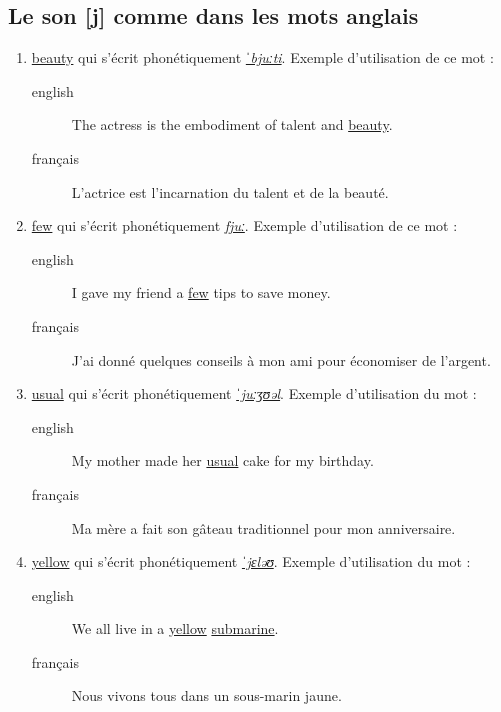 \subsection{Le son [j] comme dans les mots anglais}
\label{sec:orgacfdead}
\begin{enumerate}
\item \href{http://www.wordreference.com/enfr/beauty}{beauty} qui s'écrit phonétiquement \href{https://en.oxforddictionaries.com/definition/beauty}{\emph{ˈbjuːti}}. Exemple d'utilisation
de ce mot :
\begin{description}
\item[{english}] \textenglish{The actress is the embodiment of talent and \href{https://youtu.be/IzwWXNxFiyA}{beauty}.}
\item[{français}] L'actrice est l'incarnation du talent et de la
beauté.
\end{description}
\item \href{http://www.wordreference.com/enfr/few}{few} qui s'écrit phonétiquement \href{https://en.oxforddictionaries.com/definition/few}{\emph{fjuː}}. Exemple d'utilisation de ce
mot : 
\begin{description}
\item[{english}] \textenglish{I gave my friend a \href{https://youtu.be/6E2hYDIFDIU}{few} tips to save money.}
\item[{français}] J'ai donné quelques conseils à mon ami pour
économiser de l'argent.
\end{description}
\item \href{http://www.wordreference.com/enfr/usual}{usual} qui s'écrit phonétiquement \href{https://en.oxforddictionaries.com/definition/usual}{\emph{ˈjuːʒʊəl}}. Exemple d'utilisation
du mot :
\begin{description}
\item[{english}] \textenglish{My mother made her \href{https://youtu.be/ThLRPCs8uzc}{usual} cake for my birthday.}
\item[{français}] Ma mère a fait son gâteau traditionnel pour mon
anniversaire.
\end{description}
\item \href{http://www.wordreference.com/enfr/yellow}{yellow} qui s'écrit phonétiquement \href{https://en.oxforddictionaries.com/definition/yellow}{\emph{ˈjɛləʊ}}. Exemple d'utilisation
du mot :
\begin{description}
\item[{english}] \textenglish{We all live in a \href{https://youtu.be/m2uTFF\_3MaA}{yellow} \href{https://www.lacoccinelle.net/245633.html}{submarine}.}
\item[{français}] Nous vivons tous dans un sous-marin jaune.
\end{description}
\end{enumerate}
